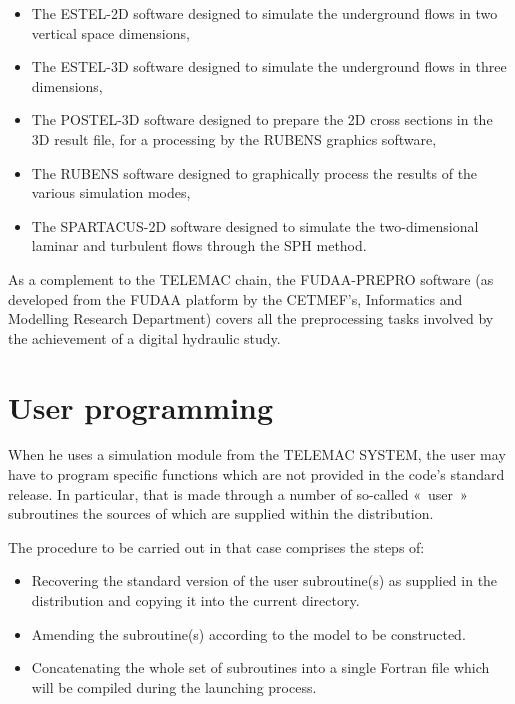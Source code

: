 \begin{itemize}
\item  The ESTEL-2D software designed to simulate the underground flows in two
  vertical space dimensions,

\item  The ESTEL-3D software designed to simulate the underground flows in three dimensions,

\item  The POSTEL-3D software designed to prepare the 2D cross sections in the
  3D result file, for a processing by the RUBENS graphics software,

\item  The RUBENS software designed to graphically process the results of the
  various simulation modes,

\item  The SPARTACUS-2D software designed to simulate the two-dimensional
  laminar and turbulent flows through the SPH method.
\end{itemize}

As a complement to the TELEMAC chain, the FUDAA-PREPRO software (as developed
from the FUDAA platform by the CETMEF's, Informatics and Modelling Research
Department) covers all the preprocessing tasks involved by the achievement of a
digital hydraulic study.


\section{User programming}

When he uses a simulation module from the TELEMAC SYSTEM, the user may have to
program specific functions which are not provided in the code's standard
release. In particular, that is made through a number of so-called «~user~»
subroutines the sources of which are supplied within the distribution.

The procedure to be carried out in that case comprises the steps of:

\begin{itemize}
\item  Recovering the standard version of the user subroutine(s) as supplied in
  the distribution and copying it into the current directory.

\item  Amending the subroutine(s) according to the model to be constructed.

\item  Concatenating the whole set of subroutines into a single Fortran file
  which will be compiled during the \artemis{} launching process.
\end{itemize}

